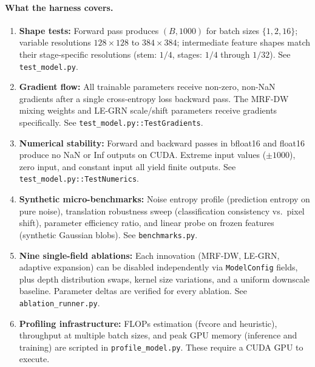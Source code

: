 \documentclass{article}
\begin{document}
\paragraph{What the harness covers.}
\begin{enumerate}[nosep]
  \item \textbf{Shape tests:} Forward pass produces $(B, 1000)$ for
        batch sizes $\{1, 2, 16\}$; variable resolutions
        $128\times128$ to $384\times384$; intermediate feature shapes
        match their stage-specific resolutions (stem: $1/4$, stages:
        $1/4$ through $1/32$).  See \texttt{test\_model.py}.
  \item \textbf{Gradient flow:} All trainable parameters receive
        non-zero, non-NaN gradients after a single
        cross-entropy loss backward pass.  The MRF-DW mixing weights
        and LE-GRN scale/shift parameters receive gradients
        specifically.  See \texttt{test\_model.py::TestGradients}.
  \item \textbf{Numerical stability:} Forward and backward passes
        in bfloat16 and float16 produce no NaN or Inf outputs on
        CUDA.  Extreme input values ($\pm1000$), zero input, and
        constant input all yield finite outputs.
        See \texttt{test\_model.py::TestNumerics}.
  \item \textbf{Synthetic micro-benchmarks:} Noise entropy profile
        (prediction entropy on pure noise), translation robustness
        sweep (classification consistency vs.\ pixel shift),
        parameter efficiency ratio, and linear probe on frozen
        features (synthetic Gaussian blobs).
        See \texttt{benchmarks.py}.
  \item \textbf{Nine single-field ablations:} Each innovation
        (MRF-DW, LE-GRN, adaptive expansion) can be disabled
        independently via \texttt{ModelConfig} fields, plus depth
        distribution swaps, kernel size variations, and a uniform
        downscale baseline.  Parameter deltas are verified for
        every ablation.  See \texttt{ablation\_runner.py}.
  \item \textbf{Profiling infrastructure:} FLOPs estimation (fvcore
        and heuristic), throughput at multiple batch sizes, and
        peak GPU memory (inference and training) are scripted in
        \texttt{profile\_model.py}.  These require a CUDA GPU to
        execute.
\end{enumerate}
\end{document}
